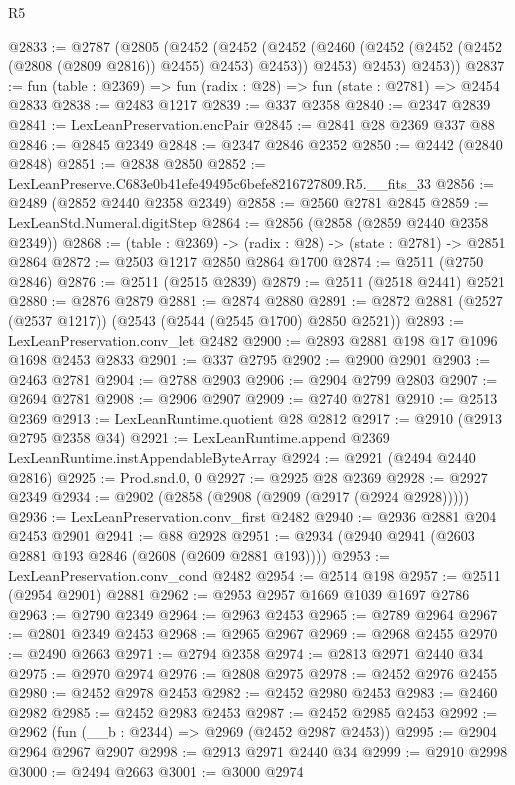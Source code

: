 \begin{lexlean}{R5}
\begin{coremodule}
@2833 := @2787
    (@2805
      (@2452
        (@2452
          (@2452 (@2460 (@2452 (@2452 (@2452 (@2808 (@2809 @2816)) @2455) @2453) @2453)) @2453)
          @2453)
        @2453))
@2837 := fun (table : @2369) => fun (radix : @28) => fun (state : @2781) => @2454 @2833
@2838 := @2483 @1217
@2839 := @337 @2358
@2840 := @2347 @2839
@2841 := LexLeanPreservation.encPair
@2845 := @2841 @28 @2369 @337 @88
@2846 := @2845 @2349
@2848 := @2347 @2846 @2352
@2850 := @2442 (@2840 @2848)
@2851 := @2838 @2850
@2852 := LexLeanPreserve.C683e0b41efe49495c6befe8216727809.R5.__fits_33
@2856 := @2489 (@2852 @2440 @2358 @2349)
@2858 := @2560 @2781 @2845
@2859 := LexLeanStd.Numeral.digitStep
@2864 := @2856 (@2858 (@2859 @2440 @2358 @2349))
@2868 := (table : @2369) -> (radix : @28) -> (state : @2781) -> @2851 @2864
@2872 := @2503 @1217 @2850 @2864 @1700
@2874 := @2511 (@2750 @2846)
@2876 := @2511 (@2515 @2839)
@2879 := @2511 (@2518 @2441) @2521
@2880 := @2876 @2879
@2881 := @2874 @2880
@2891 := @2872 @2881 (@2527 (@2537 @1217)) (@2543 (@2544 (@2545 @1700) @2850 @2521))
@2893 := LexLeanPreservation.conv_let @2482
@2900 := @2893 @2881 @198 @17 @1096 @1698 @2453 @2833
@2901 := @337 @2795
@2902 := @2900 @2901
@2903 := @2463 @2781
@2904 := @2788 @2903
@2906 := @2904 @2799 @2803
@2907 := @2694 @2781
@2908 := @2906 @2907
@2909 := @2740 @2781
@2910 := @2513 @2369
@2913 := LexLeanRuntime.quotient @28 @2812
@2917 := @2910 (@2913 @2795 @2358 @34)
@2921 := LexLeanRuntime.append @2369 LexLeanRuntime.instAppendableByteArray
@2924 := @2921 (@2494 @2440 @2816)
@2925 := Prod.snd.{0, 0}
@2927 := @2925 @28 @2369
@2928 := @2927 @2349
@2934 := @2902 (@2858 (@2908 (@2909 (@2917 (@2924 @2928)))))
@2936 := LexLeanPreservation.conv_first @2482
@2940 := @2936 @2881 @204 @2453 @2901
@2941 := @88 @2928
@2951 := @2934 (@2940 @2941 (@2603 @2881 @193 @2846 (@2608 (@2609 @2881 @193))))
@2953 := LexLeanPreservation.conv_cond @2482
@2954 := @2514 @198
@2957 := @2511 (@2954 @2901) @2881
@2962 := @2953 @2957 @1669 @1039 @1697 @2786
@2963 := @2790 @2349
@2964 := @2963 @2453
@2965 := @2789 @2964
@2967 := @2801 @2349 @2453
@2968 := @2965 @2967
@2969 := @2968 @2455
@2970 := @2490 @2663
@2971 := @2794 @2358
@2974 := @2813 @2971 @2440 @34
@2975 := @2970 @2974
@2976 := @2808 @2975
@2978 := @2452 @2976 @2455
@2980 := @2452 @2978 @2453
@2982 := @2452 @2980 @2453
@2983 := @2460 @2982
@2985 := @2452 @2983 @2453
@2987 := @2452 @2985 @2453
@2992 := @2962 (fun (__b : @2344) => @2969 (@2452 @2987 @2453))
@2995 := @2904 @2964 @2967 @2907
@2998 := @2913 @2971 @2440 @34
@2999 := @2910 @2998
@3000 := @2494 @2663
@3001 := @3000 @2974

\end{coremodule}
\end{lexlean}
